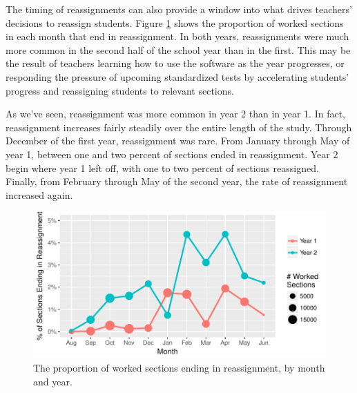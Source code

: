 \documentclass[12pt]{article}\usepackage[]{graphicx}\usepackage[]{color}
\makeatletter
\def\maxwidth{ %
  \ifdim\Gin@nat@width>\linewidth
    \linewidth
  \else
    \Gin@nat@width
  \fi
}
\makeatother
\begin{document}
The timing of reassignments can also provide a window into what drives
teachers' decisions to reassign students.
Figure \ref{fig:byMonth} shows the proportion of worked sections in
each month that end in reassignment.
In both years, reassignments were much more common in the second half
of the school year than in the first.
This may be the result of teachers learning how to use the software as
the year progresses, or responding the pressure of upcoming
standardized tests by accelerating students' progress and reassigning
students to relevant sections.

As we've seen, reassignment was more common in year 2 than in year 1.
In fact, reassignment increases fairly steadily over the entire length
of the study.
Through December of the first year, reassignment was rare. From
January through May of year 1, between one and two percent of sections
ended in reassignment.
Year 2 begin where year 1 left off, with one to two percent of
sections reassigned.
Finally, from February through May of the second year, the rate of
reassignment increased again.



\begin{figure}
  \centering

\includegraphics[width=\maxwidth]{figure/byMonth-1} 

\caption{The proportion of worked sections ending in reassignment, by
  month and year.}
\label{fig:byMonth}
\end{figure}
\end{document}
